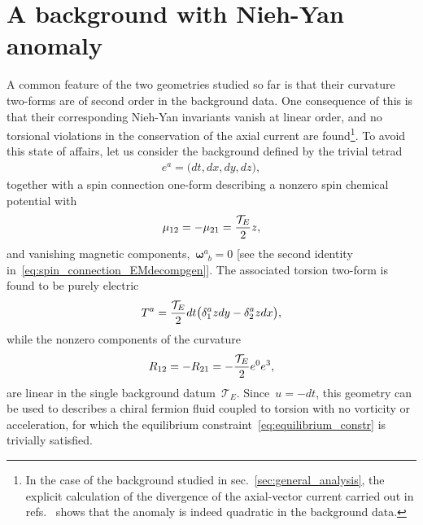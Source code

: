 \documentclass[11pt,a4paper]{article}
\begin{document}
\section{A background with Nieh-Yan anomaly}
\label{sec:NY_anomaly}

A common feature of the two geometries studied so far is that their curvature two-forms are
of second order in the background data. One consequence of this 
is that their corresponding Nieh-Yan invariants vanish
at linear order, and no torsional
violations in the conservation of the axial current are found\footnote{In the case of the background
studied in sec.~\ref{sec:general_analysis}, the explicit calculation
of the divergence of the axial-vector current carried out in refs.~\cite{Huang:2019haq,Laurila:2020yll} 
shows that the anomaly is indeed
quadratic in the background data.}. 
To avoid this state of affairs, let us consider the background defined by the
trivial tetrad
\begin{align}
e^{a}=\big(dt,dx,dy,dz\big),
\label{eq:trivial_background}
\end{align}
together with a spin connection one-form describing a nonzero spin chemical potential with
\begin{align}
\mu_{12}=-\mu_{21}={\mathcal{T}_{E}\over 2}z,
\label{eq:NY_chempot}
\end{align}
and vanishing magnetic components,~$\boldsymbol{\omega}^{a}_{\,\,\,b}=0$ [see the second identity in~\eqref{eq:spin_connection_EMdecompgen}]. The 
associated torsion two-form is found to be purely electric
\begin{align}
T^{a}={\mathcal{T}_{E}\over 2}dt\big(\delta^{a}_{1}zdy-\delta^{a}_{2}zdx\big),
\label{eq:el_torsion_NY}
\end{align}
while the nonzero components of the curvature
\begin{align}
R_{12}=-R_{21}=-{\mathcal{T}_{E}\over 2}e^{0}e^{3},
\label{eq:curvature_NY}
\end{align}
are linear in the single background datum~$\mathcal{T}_{E}$. 
Since~$u=-dt$, this geometry can be used to describes a chiral fermion
fluid coupled to torsion with no vorticity or acceleration, for which the
equilibrium constraint~\eqref{eq:equilibrium_constr} is trivially satisfied.
\end{document}
